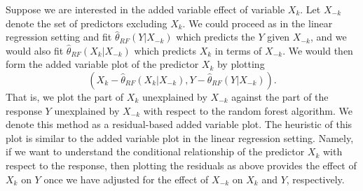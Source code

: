 \documentclass[12pt,twoside]{reedthesis}
\theoremstyle{definition}
\theoremstyle{definition}
\theoremstyle{definition}
\theoremstyle{remark}
\begin{document}
Suppose we are interested in the added variable effect of variable
\(X_k\). Let \(X_{-k}\) denote the set of predictors excluding \(X_k\).
We could proceed as in the linear regression setting and fit
\(\hat{\theta}_{RF}(Y|X_{-k})\) which predicts the \(Y\) given
\(X_{-k}\), and we would also fit \(\hat{\theta}_{RF}(X_k|X_{-k})\)
which predicts \(X_k\) in terms of \(X_{-k}\). We would then form the
added variable plot of the predictor \(X_k\) by plotting
\[(X_k-\hat{\theta}_{RF}(X_k|X_{-k}),Y-\hat{\theta}_{RF}(Y|X_{-k})).\]
That is, we plot the part of \(X_k\) unexplained by \(X_{-k}\) against
the part of the response \(Y\) unexplained by \(X_{-k}\) with respect to
the random forest algorithm. We denote this method as a residual-based
added variable plot. The heuristic of this plot is similar to the added
variable plot in the linear regression setting. Namely, if we want to
understand the conditional relationship of the predictor \(X_k\) with
respect to the response, then plotting the residuals as above provides
the effect of \(X_k\) on \(Y\) once we have adjusted for the effect of
\(X_{-k}\) on \(X_k\) and \(Y\), respectively. \par
\end{document}
